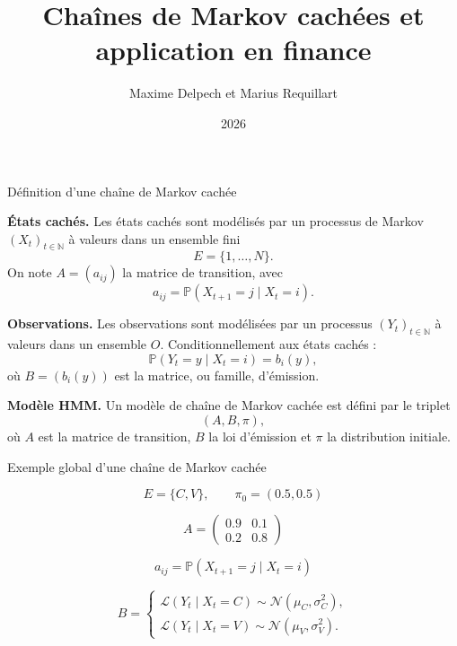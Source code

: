 \documentclass{beamer}
\title{Chaînes de Markov cachées et application en finance}
\author{Maxime Delpech et Marius Requillart}
\date{2026}
\begin{document}
\begin{frame}
    \titlepage
\end{frame}


\begin{frame}{Définition d'une chaîne de Markov cachée}

\small

\textbf{États cachés.}
Les états cachés sont modélisés par un processus de Markov
\((X_t)_{t\in\mathbb{N}}\) à valeurs dans un ensemble fini
\[
E=\{1,\dots,N\}.
\]
On note \(A=(a_{ij})\) la matrice de transition, avec
\[
a_{ij}=\mathbb{P}(X_{t+1}=j \mid X_t=i).
\]

\vspace{0.2cm}

\textbf{Observations.}
Les observations sont modélisées par un processus
\((Y_t)_{t\in\mathbb{N}}\) à valeurs dans un ensemble \(O\). 
Conditionnellement aux états cachés :
\[
\mathbb{P}(Y_t=y \mid X_t=i)=b_i(y),
\]
où \(B=(b_i(y))\) est la matrice, ou famille, d'émission.

\vspace{0.2cm}

\textbf{Modèle HMM.}
Un modèle de chaîne de Markov cachée est défini par le triplet
\[
(A,B,\pi),
\]
où \(A\) est la matrice de transition, \(B\) la loi d'émission et
\(\pi\) la distribution initiale.

\end{frame}



\begin{frame}{Exemple global d'une chaîne de Markov cachée}

\large

\[
E=\{C,V\},
\qquad
\pi_0=(0.5,0.5)
\]

\vspace{0.4cm}

\[
A=
\begin{pmatrix}
0.9 & 0.1 \\
0.2 & 0.8
\end{pmatrix}
\]

\vspace{0.3cm}

\[
a_{ij}=\mathbb{P}(X_{t+1}=j\mid X_t=i)
\]

\vspace{0.4cm}

\[
B=
\begin{cases}
\mathcal{L}(Y_t\mid X_t=C)\sim \mathcal{N}(\mu_C,\sigma_C^2),\\
\mathcal{L}(Y_t\mid X_t=V)\sim \mathcal{N}(\mu_V,\sigma_V^2).
\end{cases}
\]

\end{frame}
\end{document}
